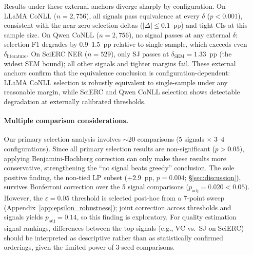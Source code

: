 Results under these external anchors diverge sharply by configuration.
On LLaMA CoNLL ($n{=}2{,}756$), all signals pass equivalence at every $\delta$ ($p{<}0.001$), consistent with the near-zero selection deltas ($|\Delta|{\leq}0.1$~pp) and tight CIs at this sample size.
On Qwen CoNLL ($n{=}2{,}756$), no signal passes at any external $\delta$: selection F1 degrades by 0.9--1.5~pp relative to single-sample, which exceeds even $\delta_{\mathrm{literature}}$.
On SciERC NER ($n{=}529$), only SJ passes at $\delta_{\mathrm{SEM}}{=}1.33$~pp (the widest SEM bound); all other signals and tighter margins fail.
These external anchors confirm that the equivalence conclusion is configuration-dependent: LLaMA CoNLL selection is robustly equivalent to single-sample under any reasonable margin, while SciERC and Qwen CoNLL selection shows detectable degradation at externally calibrated thresholds.

\paragraph{Multiple comparison considerations.}\label{app:multiple_comparisons}
Our primary selection analysis involves ${\sim}$20 comparisons (5 signals $\times$ 3--4 configurations).
Since all primary selection results are non-significant ($p{>}0.05$), applying Benjamini-Hochberg correction can only make these results more conservative, strengthening the ``no signal beats greedy'' conclusion.
The sole positive finding, the non-tied LP subset ($+2.9$~pp, $p{=}0.004$; \S\ref{sec:discussion}), survives Bonferroni correction over the 5 signal comparisons ($p_{\mathrm{adj}}{=}0.020 < 0.05$). However, the $\varepsilon{=}0.05$ threshold is selected post-hoc from a 7-point sweep (Appendix~\ref{app:epsilon_robustness}); joint correction across thresholds and signals yields $p_{\mathrm{adj}}{=}0.14$, so this finding is exploratory.
For quality estimation signal rankings, differences between the top signals (e.g., VC vs.\ SJ on SciERC) should be interpreted as descriptive rather than as statistically confirmed orderings, given the limited power of 3-seed comparisons.


